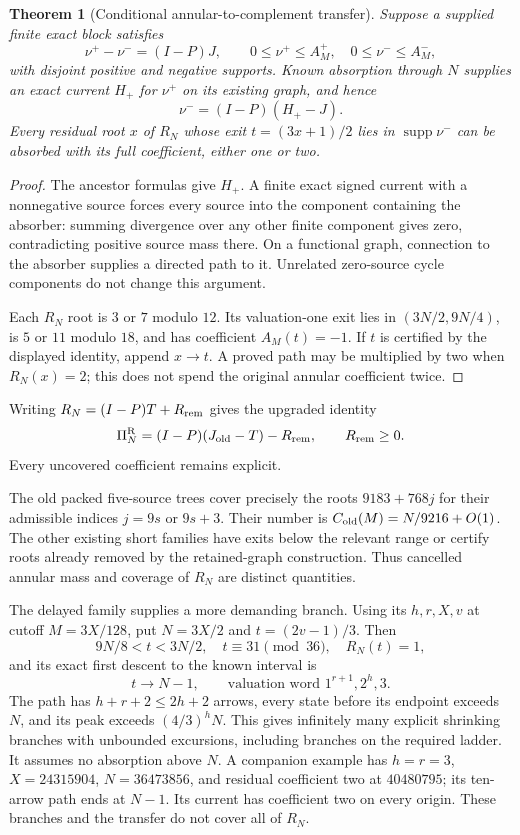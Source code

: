 \documentclass[11pt]{article}
\newtheorem{theorem}{Theorem}
\newcommand{\PiR}{\Pi^{\mathrm R}}
\newcommand{\supp}{\operatorname{supp}}
\begin{document}
\begin{theorem}[Conditional annular-to-complement transfer]
Suppose a supplied finite exact block satisfies
\[
\nu^+-\nu^-=(I-P)J,\qquad
0\le\nu^+\le A_M^+,\quad 0\le\nu^-\le A_M^-,
\]
with disjoint positive and negative supports. Known absorption through
$N$ supplies an exact current $H_+$ for $\nu^+$ on its existing graph,
and hence
\[
\nu^-=(I-P)(H_+-J).
\]
Every residual root $x$ of $R_N$ whose exit
$t=(3x+1)/2$ lies in $\supp\nu^-$ can be absorbed with its full
coefficient, either one or two.
\end{theorem}
\begin{proof}
The ancestor formulas give $H_+$. A finite exact signed current with a
nonnegative source forces every source into the component containing
the absorber: summing divergence over any other finite component gives
zero, contradicting positive source mass there. On a functional graph,
connection to the absorber supplies a directed path to it. Unrelated
zero-source cycle components do not change this argument.

Each $R_N$ root is $3$ or $7$ modulo $12$. Its valuation-one exit lies
in $(3N/2,9N/4)$, is $5$ or $11$ modulo $18$, and has coefficient
$A_M(t)=-1$. If $t$ is certified by the displayed identity, append
$x\to t$. A proved path may be multiplied by two when $R_N(x)=2$;
this does not spend the original annular coefficient twice.
\end{proof}
Writing $R_N=(I-P)T+R_{\rm rem}$ gives the upgraded identity
\[
\PiR_N=(I-P)(J_{\rm old}-T)-R_{\rm rem},
\qquad R_{\rm rem}\ge0.
\]
Every uncovered coefficient remains explicit.

The old packed five-source trees cover precisely the roots
$9183+768j$ for their admissible indices $j=9s$ or $9s+3$.
Their number is $C_{\rm old}(M)=N/9216+O(1)$.
The other existing short families have exits below the relevant range
or certify roots already removed by the retained-graph construction.
Thus cancelled annular mass and coverage of $R_N$ are distinct quantities.

The delayed family supplies a more demanding branch. Using its
$h,r,X,v$ at cutoff $M=3X/128$, put $N=3X/2$ and $t=(2v-1)/3$.
Then
\[
9N/8<t<3N/2,\quad t\equiv31\pmod{36},\quad R_N(t)=1,
\]
and its exact first descent to the known interval is
\[
t\longrightarrow N-1,\qquad
\text{valuation word }1^{r+1},2^h,3.
\]
The path has $h+r+2\le2h+2$ arrows, every state before its endpoint
exceeds $N$, and its peak exceeds $(4/3)^hN$. This gives infinitely
many explicit shrinking branches with unbounded excursions, including
branches on the required ladder. It assumes no absorption above $N$.
A companion example has $h=r=3$, $X=24315904$, $N=36473856$,
and residual coefficient two at $40480795$; its ten-arrow path ends
at $N-1$. Its current has coefficient two on every origin.
These branches and the transfer do not cover all of $R_N$.
\end{document}
